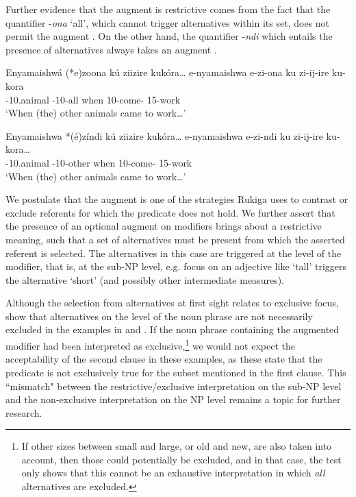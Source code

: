 \documentclass[output=paper]{langscibook}
\begin{document}
Further evidence that the augment is restrictive comes from the fact that the quantifier -\textit{ona} ‘all’, which cannot trigger alternatives within its set, does not permit the augment . On the other hand, the quantifier -\textit{ndi} which entails the presence of alternatives always takes an augment .

\ea
\label{bkm:Ref111494451}
Enyamaishwá  (*e)zoona  kú  ziizire  kukóra…
\gll
e-nyamaishwa  e-zi-ona  ku  zi-ij-ire  ku-kora\\
\AUG{}-10.animal  \AUG{}-10-all  when  10\SM{}-come-\PFV{}  15-work\\
\glt
‘When (the) other animals came to work…’\\


\z

\ea
\label{bkm:Ref111494462}
Enyamaishwa *(é)zíndi kú ziizire kukóra…
\gll
e-nyamaishwa e-zi-ndi    ku  zi-ij-ire  ku-kora…\\
 \AUG{}-10.animal  \AUG{}-10-other when  10\SM{}-come-\PFV{}  15-work\\
\glt
‘When (the) other animals came to work…’\\


\z


We postulate that the augment is one of the strategies Rukiga uses to contrast or exclude referents for which the predicate does not hold. We further assert that the presence of an optional augment on modifiers brings about a restrictive meaning, such that a set of alternatives must be present from which the asserted referent is selected. The alternatives in this case are triggered at the level of the modifier, that is, at the sub-NP level, e.g. focus on an adjective like ‘tall’ triggers the alternative ‘short’ (and possibly other intermediate measures). 

  Although the selection from alternatives at first sight relates to exclusive focus, \citet{AsiimweEtAl2023} show that alternatives on the level of the noun phrase are not necessarily excluded in the examples in  and . If the noun phrase containing the augmented modifier had been interpreted as exclusive,\footnote{If other sizes between small and large, or old and new, are also taken into account, then those could potentially be excluded, and in that case, the test only shows that this cannot be an exhaustive interpretation in which \textit{all} alternatives are excluded.} we would not expect the acceptability of the second clause in these examples, as these state that the predicate is not exclusively true for the subset mentioned in the first clause. This ``mismatch" between the restrictive/exclusive interpretation on the sub-NP level and the non-exclusive interpretation on the NP level remains a topic for further research.
\end{document}
